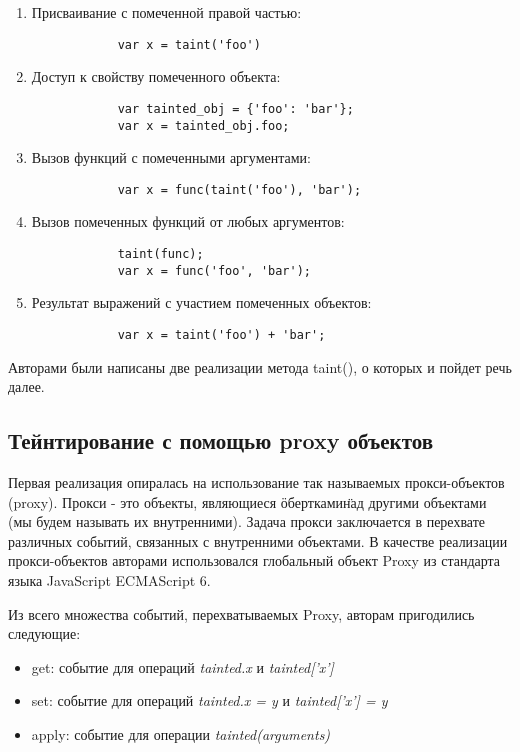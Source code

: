 \begin{enumerate}
	\item Присваивание с помеченной правой частью:
		\begin{lstlisting}
			var x = taint('foo')
		\end{lstlisting}
	\item Доступ к свойству помеченного объекта: 
		\begin{lstlisting}
			var tainted_obj = {'foo': 'bar'}; 
			var x = tainted_obj.foo; 
		\end{lstlisting}
	\item Вызов функций с помеченными аргументами:
		\begin{lstlisting}
			var x = func(taint('foo'), 'bar');
		\end{lstlisting}
	\item Вызов помеченных функций от любых аргументов:
		\begin{lstlisting}
			taint(func);
			var x = func('foo', 'bar');
		\end{lstlisting}
	\item Результат выражений с участием помеченных объектов:
		\begin{lstlisting}
			var x = taint('foo') + 'bar';
		\end{lstlisting}
\end{enumerate}


Авторами были написаны две реализации метода taint(), о которых и пойдет речь далее.

\subsection{Тейнтирование с помощью proxy объектов}
	
	Первая реализация опиралась на использование так называемых прокси-объектов (proxy). Прокси - это объекты, являющиеся \"обертками\" над другими объектами (мы будем называть их внутренними). Задача прокси заключается в перехвате различных событий, связанных с внутренними объектами. В качестве реализации прокси-объектов авторами использовался глобальный объект Proxy из стандарта языка JavaScript ECMAScript 6.

	
	Из всего множества событий, перехватываемых Proxy, авторам пригодились следующие:
	

	\begin{itemize}
		\item get: событие для операций \textit{tainted.x} и \textit{tainted['x']}
		\item set: событие для операций \textit{tainted.x = y} и \textit{tainted['x'] = y}
		\item apply: событие для операции \textit{tainted(arguments)}
	\end{itemize}


